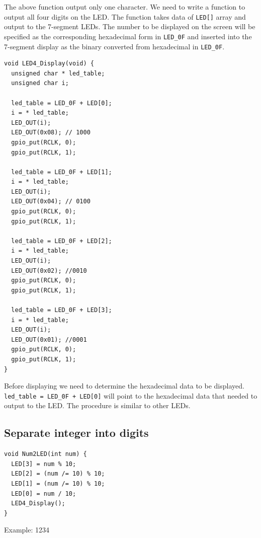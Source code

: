 \documentclass[a4paper,twoside]{report}
\begin{document}
The above function output only one character. We need to write a function to output all four digits on the LED. The function takes data of \texttt{LED[]} array and output to the 7-segment LEDs. The number to be displayed on the screen will be specified as the corresponding hexadecimal form in \texttt{LED\_0F} and inserted into the 7-segment display as the binary converted from hexadecimal in \texttt{LED\_0F}.

\begin{verbatim}
void LED4_Display(void) {
  unsigned char * led_table;
  unsigned char i;

  led_table = LED_0F + LED[0];
  i = * led_table;
  LED_OUT(i);
  LED_OUT(0x08); // 1000
  gpio_put(RCLK, 0);
  gpio_put(RCLK, 1);

  led_table = LED_0F + LED[1];
  i = * led_table;
  LED_OUT(i);
  LED_OUT(0x04); // 0100
  gpio_put(RCLK, 0);
  gpio_put(RCLK, 1);

  led_table = LED_0F + LED[2];
  i = * led_table;
  LED_OUT(i);
  LED_OUT(0x02); //0010
  gpio_put(RCLK, 0);
  gpio_put(RCLK, 1);

  led_table = LED_0F + LED[3];
  i = * led_table;
  LED_OUT(i);
  LED_OUT(0x01); //0001
  gpio_put(RCLK, 0);
  gpio_put(RCLK, 1);
}
\end{verbatim}

Before displaying we need to determine the hexadecimal data to be displayed. \texttt{led\_table = LED\_0F + LED[0]} will point to the hexadecimal data that needed to output to the LED. The procedure is similar to other LEDs.

\subsection{Separate integer into digits}
\begin{verbatim}
void Num2LED(int num) {
  LED[3] = num % 10;
  LED[2] = (num /= 10) % 10;
  LED[1] = (num /= 10) % 10;
  LED[0] = num / 10;
  LED4_Display();
}
\end{verbatim}
Example: 1234
\end{document}
